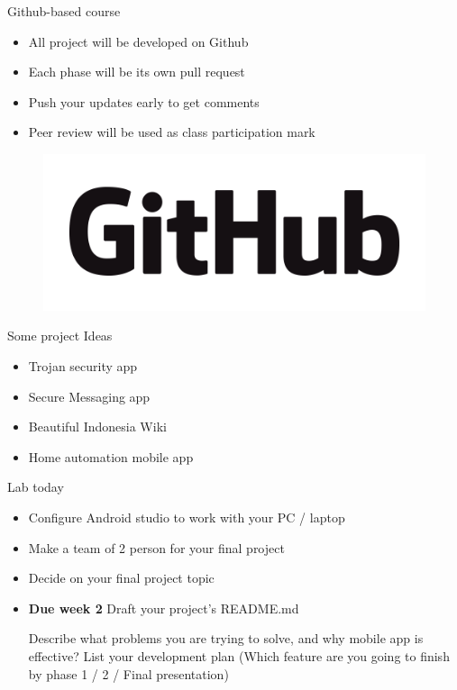 \documentclass{beamer}
\begin{document}
   \begin{frame}{Github-based course}
     \begin{itemize}
     	\item All project will be developed on Github
     	\item Each phase will be its own pull request
     	\item Push your updates early to get comments
     	\item Peer review will be used as class participation mark
     \end{itemize}
     	\begin{center}
		\begin{figure}
		\includegraphics[scale=0.2]{images/GitHub_Logo.png}
		\end{figure}
	\end{center}
  \end{frame}
    
   \begin{frame}{Some project Ideas}
     \begin{itemize}
     	\item Trojan security app
     	\item Secure Messaging app
     	\item Beautiful Indonesia Wiki
     	\item Home automation mobile app
     \end{itemize}
  \end{frame}
  
    \begin{frame}{Lab today}
     \begin{itemize}

    	\item Configure Android studio to work with your PC / laptop

		\item Make a team of 2 person for your final project
		
		\item Decide on your final project topic
		
		\item \textbf{Due week 2} Draft your project's README.md
		
		Describe what problems you are trying to solve, and  why mobile app is effective? List your development plan (Which feature are you going to finish by phase 1 / 2 / Final presentation)
	\end{itemize}
  \end{frame}
  
  
\end{document}
